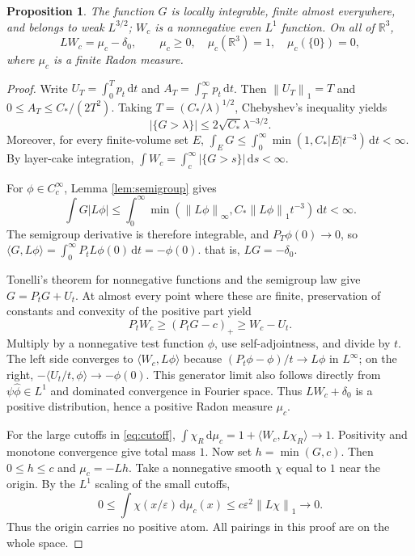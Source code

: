 \documentclass[11pt,a4paper]{article}
\newtheorem{proposition}[theorem]{Proposition}
\theoremstyle{definition}\newtheorem{definition}[theorem]{Definition}
\theoremstyle{remark}\newtheorem{remark}[theorem]{Remark}
\newcommand{\R}{\mathbb R}
\newcommand{\dd}{\,\mathrm d}
\newcommand{\norm}[1]{\left\lVert#1\right\rVert}
\newcommand{\abs}[1]{\left|#1\right|}
\begin{document}
\begin{proposition}\label{prop:source}
The function $G$ is locally integrable, finite almost everywhere, and belongs to weak $L^{3/2}$; $W_c$ is a nonnegative even $L^1$ function. On all of $\R^3$,
\begin{equation}\label{eq:source}
 LW_c=\mu_c-\delta_0,
 \qquad \mu_c\ge0,\quad\mu_c(\R^3)=1,\quad\mu_c(\{0\})=0,
\end{equation}
where $\mu_c$ is a finite Radon measure.
\end{proposition}
\begin{proof}
Write $U_T=\int_0^Tp_t\dd t$ and $A_T=\int_T^\infty p_t\dd t$. Then $\norm{U_T}_1=T$ and $0\le A_T\le C_*/(2T^2)$. Taking $T=(C_*/\lambda)^{1/2}$, Chebyshev's inequality yields
\[
 \abs{\{G>\lambda\}}\le 2\sqrt{C_*}\lambda^{-3/2}.
\]
Moreover, for every finite-volume set $E$,
$\int_EG\le\int_0^\infty\min(1,C_*\abs E t^{-3})\dd t<\infty$.
By layer-cake integration, $\int W_c=\int_c^\infty\abs{\{G>s\}}\dd s<\infty$.

For $\phi\in C_c^\infty$, Lemma \ref{lem:semigroup} gives
\[
 \int G\abs{L\phi}
 \le\int_0^\infty\min(\norm{L\phi}_\infty,
 C_*\norm{L\phi}_1t^{-3})\dd t<\infty.
\]
The semigroup derivative is therefore integrable, and $P_T\phi(0)\to0$, so
$\langle G,L\phi\rangle=\int_0^\infty P_tL\phi(0)\dd t=-\phi(0)$.
that is, $LG=-\delta_0$.

Tonelli's theorem for nonnegative functions and the semigroup law give $G=P_tG+U_t$. At almost every point where these are finite, preservation of constants and convexity of the positive part yield
\[
 P_tW_c\ge(P_tG-c)_+\ge W_c-U_t.
\]
Multiply by a nonnegative test function $\phi$, use self-adjointness, and divide by $t$. The left side converges to $\langle W_c,L\phi\rangle$ because $(P_t\phi-\phi)/t\to L\phi$ in $L^\infty$; on the right, $-\langle U_t/t,\phi\rangle\to-\phi(0)$. This generator limit also follows directly from $\psi\widehat\phi\in L^1$ and dominated convergence in Fourier space. Thus $LW_c+\delta_0$ is a positive distribution, hence a positive Radon measure $\mu_c$.

For the large cutoffs in \eqref{eq:cutoff},
$\int\chi_R\dd\mu_c=1+\langle W_c,L\chi_R\rangle\to1$.
Positivity and monotone convergence give total mass $1$. Now set $h=\min(G,c)$. Then $0\le h\le c$ and $\mu_c=-Lh$. Take a nonnegative smooth $\chi$ equal to $1$ near the origin. By the $L^1$ scaling of the small cutoffs,
\[
 0\le\int\chi(x/\varepsilon)\dd\mu_c(x)
 \le c\varepsilon^2\norm{L\chi}_1\longrightarrow0.
\]
Thus the origin carries no positive atom. All pairings in this proof are on the whole space.
\end{proof}
\end{document}
